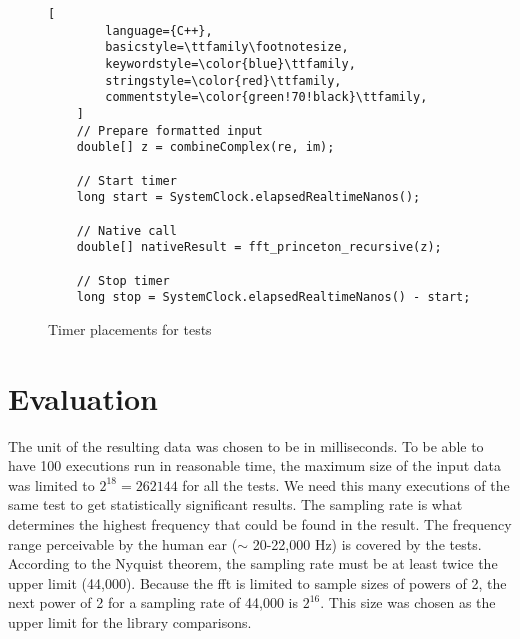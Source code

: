 \ifrelease
\begin{figure}
\begin{lstlisting}[
        language={C++},
        basicstyle=\ttfamily\footnotesize,
        keywordstyle=\color{blue}\ttfamily,
        stringstyle=\color{red}\ttfamily,
        commentstyle=\color{green!70!black}\ttfamily,
    ]
    // Prepare formatted input
    double[] z = combineComplex(re, im);

    // Start timer
    long start = SystemClock.elapsedRealtimeNanos();

    // Native call
    double[] nativeResult = fft_princeton_recursive(z);

    // Stop timer
    long stop = SystemClock.elapsedRealtimeNanos() - start;
\end{lstlisting}
\caption{Timer placements for tests}
\label{fig:timer:pos}
\end{figure}
\fi


\section{Evaluation}
The unit of the resulting data was chosen to be in milliseconds. To be able to have 100 executions run in reasonable time, the maximum size of the input data was limited to $2^{18} = 262144$ for all the tests. We need this many executions of the same test to get statistically significant results. The sampling rate is what determines the highest frequency that could be found in the result. The frequency range perceivable by the human ear ($\sim$ 20-22,000 Hz) is covered by the tests. According to the Nyquist theorem, the sampling rate must be at least twice the upper limit (44,000). Because the \gls{fft} is limited to sample sizes of powers of 2, the next power of 2 for a sampling rate of 44,000 is $2^{16}$. This size was chosen as the upper limit for the library comparisons.

